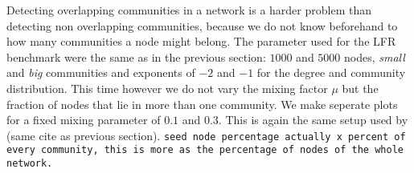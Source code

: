 Detecting overlapping communities in a network is a harder problem than detecting non overlapping communities, because we do not know beforehand to how many communities a node might belong. The parameter used for the LFR benchmark were the same as in the previous section: $1000$ and $5000$ nodes, \textit{small} and \textit{big} communities and exponents of $-2$ and $-1$ for the degree and community distribution. This time however we do not vary the mixing factor $\mu$ but the fraction of nodes that lie in more than one community. We make seperate plots for a fixed mixing parameter of $0.1$ and $0.3$. This is again the same setup used by (same cite as previous section).
{\tt seed node percentage actually x percent of every community, this is more as the percentage of nodes of the whole network.}

